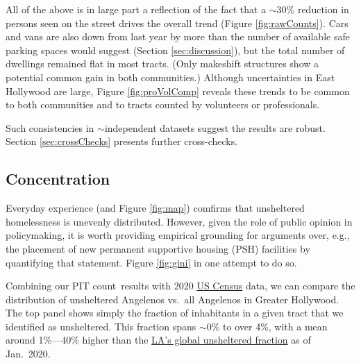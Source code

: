 \documentclass[11pt,twocolumn]{article}
\def\Count{count}
\begin{document}
All of the above is in large part a reflection of the fact that a $\sim$30\% reduction in persons seen 
on the street drives the overall trend (Figure \ref{fig:rawCounts}). Cars and vans are also down from 
last year by more than the number of available safe parking spaces would suggest 
(Section \ref{sec:discussion}), but the total number of dwellings remained flat in most tracts. 
(Only makeshift structures show a potential common gain in both communities.)
Although uncertainties in East Hollywood are large, Figure \ref{fig:proVolComp} reveals these 
trends to be common to both communities and to tracts counted by volunteers or professionals.

Such consistencies in $\sim$independent datasets suggest the results are robust. Section
 \ref{sec:crossChecks} presents further cross-checks.


\subsection{Concentration}
\label{sec:concentration}

Everyday experience (and Figure \ref{fig:map}) comfirms that unsheltered homelessness is
unevenly distributed. However, given the role of public opinion in policymaking, it is worth 
providing empirical grounding for arguments over, e.g., the placement of new permanent supportive 
housing (PSH) facilities by quantifying that statement. Figure \ref{fig:gini} in one attempt to do so. 

Combining our PIT \Count\ results with 2020 
\href{https://geomap.ffiec.gov/FFIECGeocMap/GeocodeMap1.aspx}{US Census} 
data, we can compare the distribution of unsheltered Angelenos vs.\ all Angelenos in Greater
Hollywood. The top panel shows simply the fraction of inhabitants in a given tract that we
identified as unsheltered. This fraction spans $\sim$0\% to over 4\%, with a mean around 
1\%---40\% higher than the \href{https://www.lahsa.org/documents?id=4680-2020-greater-los-angeles-homeless-count-city-of-los-angeles}{LA's global unsheltered fraction} as of Jan.~2020.
\end{document}
